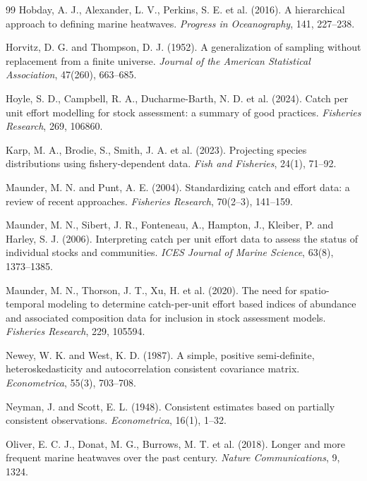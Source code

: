 \documentclass[11pt,a4paper]{article}
\begin{document}
\begin{thebibliography}{99}
Hobday, A. J., Alexander, L. V., Perkins, S. E. et al. (2016). A hierarchical approach to defining marine heatwaves. \textit{Progress in Oceanography}, 141, 227--238.

Horvitz, D. G. and Thompson, D. J. (1952). A generalization of sampling without replacement from a finite universe. \textit{Journal of the American Statistical Association}, 47(260), 663--685.

Hoyle, S. D., Campbell, R. A., Ducharme-Barth, N. D. et al. (2024). Catch per unit effort modelling for stock assessment: a summary of good practices. \textit{Fisheries Research}, 269, 106860.

Karp, M. A., Brodie, S., Smith, J. A. et al. (2023). Projecting species distributions using fishery-dependent data. \textit{Fish and Fisheries}, 24(1), 71--92.

Maunder, M. N. and Punt, A. E. (2004). Standardizing catch and effort data: a review of recent approaches. \textit{Fisheries Research}, 70(2--3), 141--159.

Maunder, M. N., Sibert, J. R., Fonteneau, A., Hampton, J., Kleiber, P. and Harley, S. J. (2006). Interpreting catch per unit effort data to assess the status of individual stocks and communities. \textit{ICES Journal of Marine Science}, 63(8), 1373--1385.

Maunder, M. N., Thorson, J. T., Xu, H. et al. (2020). The need for spatio-temporal modeling to determine catch-per-unit effort based indices of abundance and associated composition data for inclusion in stock assessment models. \textit{Fisheries Research}, 229, 105594.

Newey, W. K. and West, K. D. (1987). A simple, positive semi-definite, heteroskedasticity and autocorrelation consistent covariance matrix. \textit{Econometrica}, 55(3), 703--708.

Neyman, J. and Scott, E. L. (1948). Consistent estimates based on partially consistent observations. \textit{Econometrica}, 16(1), 1--32.

Oliver, E. C. J., Donat, M. G., Burrows, M. T. et al. (2018). Longer and more frequent marine heatwaves over the past century. \textit{Nature Communications}, 9, 1324.


\end{thebibliography}
\end{document}
